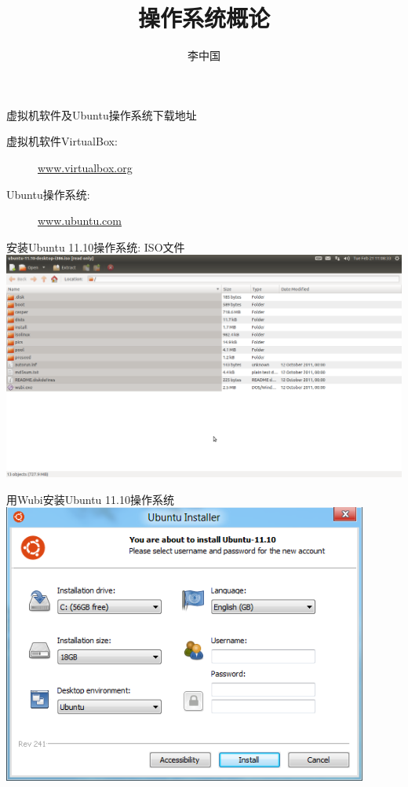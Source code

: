 \documentclass[xcolor=svgnames]{beamer}
\begin{document}
\begin{CJK*}{UTF8}{gbsn}


\title{操作系统概论}

\author{李中国}
\date{}

\begin{frame}
  \titlepage
\end{frame}


\begin{frame}{虚拟机软件及Ubuntu操作系统下载地址}
\begin{description}
\item[虚拟机软件VirtualBox:] \url{www.virtualbox.org}
\item[Ubuntu操作系统:] \url{www.ubuntu.com}
\end{description}
\end{frame}

\begin{frame}{安装Ubuntu 11.10操作系统: ISO文件}
\includegraphics[width=1.5\textwidth]{ubuntu-iso.png}
\end{frame}

\begin{frame}{用Wubi安装Ubuntu 11.10操作系统}
\includegraphics[width=0.9\textwidth]{wubi.png}
\end{frame}


\end{CJK*}
\end{document}
